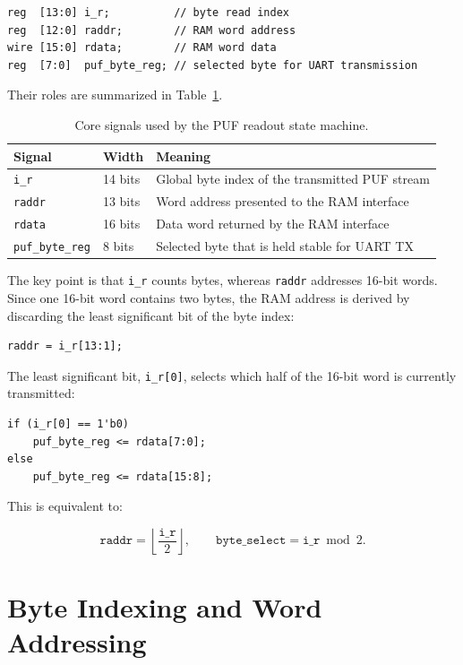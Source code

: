 \documentclass[11pt,a4paper]{article}
\begin{document}
\begin{lstlisting}
reg  [13:0] i_r;          // byte read index
reg  [12:0] raddr;        // RAM word address
wire [15:0] rdata;        // RAM word data
reg  [7:0]  puf_byte_reg; // selected byte for UART transmission
\end{lstlisting}

Their roles are summarized in Table~\ref{tab:signals}.

\begin{table}[h]
\centering
\renewcommand{\arraystretch}{1.25}
\begin{tabular}{@{}lll@{}}
\toprule
Signal & Width & Meaning \\
\midrule
\texttt{i\_r} & 14 bits & Global byte index of the transmitted PUF stream \\
\texttt{raddr} & 13 bits & Word address presented to the RAM interface \\
\texttt{rdata} & 16 bits & Data word returned by the RAM interface \\
\texttt{puf\_byte\_reg} & 8 bits & Selected byte that is held stable for UART TX \\
\bottomrule
\end{tabular}
\caption{Core signals used by the PUF readout state machine.}
\label{tab:signals}
\end{table}

The key point is that \texttt{i\_r} counts bytes, whereas \texttt{raddr} addresses 16-bit words. Since one 16-bit word contains two bytes, the RAM address is derived by discarding the least significant bit of the byte index:

\begin{lstlisting}
raddr = i_r[13:1];
\end{lstlisting}

The least significant bit, \texttt{i\_r[0]}, selects which half of the 16-bit word is currently transmitted:

\begin{lstlisting}
if (i_r[0] == 1'b0)
    puf_byte_reg <= rdata[7:0];
else
    puf_byte_reg <= rdata[15:8];
\end{lstlisting}

This is equivalent to:

\[
\texttt{raddr} = \left\lfloor \frac{\texttt{i\_r}}{2} \right\rfloor,
\qquad
\texttt{byte\_select} = \texttt{i\_r} \bmod 2.
\]

\section{Byte Indexing and Word Addressing}
\end{document}
